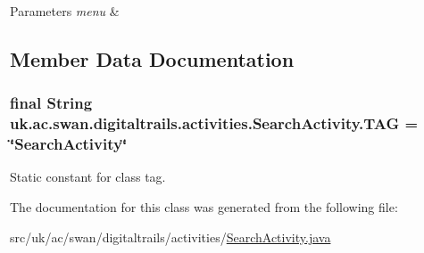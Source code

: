 \begin{DoxyParams}{Parameters}
{\em menu} & \\
\hline
\end{DoxyParams}


\subsection{Member Data Documentation}
\hypertarget{classuk_1_1ac_1_1swan_1_1digitaltrails_1_1activities_1_1_search_activity_a0c23cfe7dac0b9b46a17a05a96073bd7}{
\subsubsection[{T\+A\+G}]{\setlength{\rightskip}{0pt plus 5cm}final String uk.\+ac.\+swan.\+digitaltrails.\+activities.\+Search\+Activity.\+T\+A\+G = \char`\"{}Search\+Activity\char`\"{}\hspace{0.3cm}{\ttfamily [static]}}}\label{classuk_1_1ac_1_1swan_1_1digitaltrails_1_1activities_1_1_search_activity_a0c23cfe7dac0b9b46a17a05a96073bd7}


Static constant for class tag. 



The documentation for this class was generated from the following file\+:\begin{DoxyCompactItemize}
\item 
src/uk/ac/swan/digitaltrails/activities/\hyperlink{_search_activity_8java}{Search\+Activity.\+java}\end{DoxyCompactItemize}
